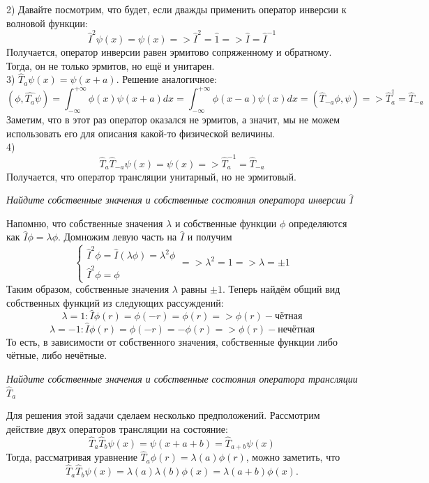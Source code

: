 2) Давайте посмотрим, что будет, если дважды применить оператор инверсии к волновой функции:
\[
\hat I^2 \psi(x) = \psi(x) => \hat I^2 = \hat 1 => \hat{I} = \hat{I}^{-1}
\]
Получается, оператор инверсии равен эрмитово сопряженному и обратному. Тогда, он не только эрмитов, но ещё и унитарен.\\
3) $\hat T_a \psi(x) = \psi(x+a)$. Решение аналогичное:
\[
(\phi, \hat{T_a} \psi) = \int^{+\infty}_{-\infty} \phi(x)\psi(x+a) dx = \int^{+\infty}_{-\infty} \phi(x-a) \psi(x)dx = (\hat{T}_{-a}\phi, \psi) => \hat T^{\dagger}_a = \hat T_{-a} 
\]
Заметим, что в этот раз оператор оказался не эрмитов, а значит, мы не можем использовать его для описания какой-то физической величины.\\
4) 
\[
\hat T_a \hat T_{-a} \psi(x) = \psi(x) => \hat T_a^{-1} = \hat T_{-a}
\]
Получается, что оператор трансляции унитарный, но не эрмитовый.
\newpage
{}
\begin{center}
\textit{Найдите собственные значения и собственные состояния оператора инверсии $\hat I$}
\end{center}
Напомню, что собственные значения $\lambda$ и собственные функции $\phi$ определяются как $\hat I \phi = \lambda \phi$. Домножим левую часть на $\hat I$ и получим
\[
\begin{cases}
\hat I^2 \phi = \hat I(\lambda \phi) = \lambda^2\phi \\
\hat I^2 \phi = \phi
\end{cases}
=> \lambda^2 = 1 => \lambda = \pm 1
\]
Таким образом, собственные значения $\lambda$ равны $\pm 1$. Теперь найдём общий вид собственных функций из следующих рассуждений:
\[
\lambda = 1: \hat I \phi(r) = \phi(-r) = \phi(r) => \phi(r) - \text{чётная}
\]
\[
\lambda = -1: \hat I \phi(r) = \phi(-r) = -\phi(r) => \phi(r) - \text{нечётная}
\]
То есть, в зависимости от собственного значения, собственные функции либо чётные, либо нечётные.
\begin{center}
\textit{Найдите собственные значения и собственные состояния оператора трансляции $\hat T_a$}
\end{center}
Для решения этой задачи сделаем несколько предположений. Рассмотрим действие двух операторов трансляции на состояние:
\[
\hat{T}_{a}\hat{T}_{b}\psi(x) = \psi(x + a + b) = \hat{T}_{a+b}\psi(x)
\]
Тогда, рассматривая уравнение $\hat T_a \phi(r) = \lambda(a) \phi(r)$, можно заметить, что
\[
\hat{T}_{a}\hat{T}_{b}\psi(x) = \lambda(a)\lambda(b)\phi(x) = \lambda(a+b)\phi(x).
\]
